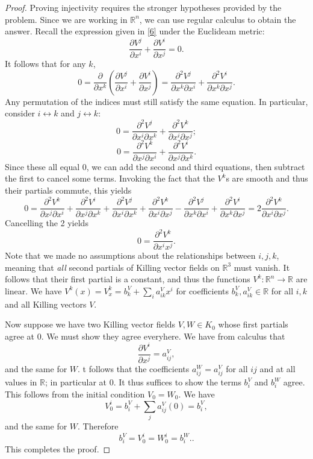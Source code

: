 \documentclass[11pt, letterpaper]{article}
\begin{document}
\begin{proof}
	Proving injectivity requires the stronger hypotheses provided by the problem. Since we are working in $\mathbb{R} ^n$, we can use regular calculus to obtain the answer. Recall the expression given in \cref{6} under the Euclideam metric:
	\[
		\frac{\partial V^j}{\partial x^i} +\frac{\partial V^i}{\partial x^j} =0
	.\]
	It follows that for any $k$,
	\[
		0=\frac{\partial }{\partial x^k} \left( \frac{\partial V^j}{\partial x^i} +\frac{\partial V^i}{\partial x^j}  \right) =\frac{\partial^2 V^j}{\partial x^k \partial x^i} + \frac{\partial^2 V^i}{\partial x^k \partial x^j} 
	.\]
	Any permutation of the indices must still satisfy the same equation. In particular, consider $i\leftrightarrow k$ and $j\leftrightarrow k$:
	\[
		0=\frac{\partial^2 V^j}{\partial x^i \partial x^k} + \frac{\partial^2 V^k}{\partial x^i \partial x^j} 
	;\]
	\[
		0=\frac{\partial^2 V^k}{\partial x^j \partial x^i} + \frac{\partial^2 V^i}{\partial x^j \partial x^k} 
	.\]
	Since these all equal 0, we can add the second and third equations, then subtract the first to cancel some terms. Invoking the fact that the $V^k$s are smooth and thus their partials commute, this yields
	\[
		0=\frac{\partial^2 V^k}{\partial x^j \partial x^i} + \frac{\partial^2 V^i}{\partial x^j \partial x^k} +\frac{\partial^2 V^j}{\partial x^i \partial x^k} + \frac{\partial^2 V^k}{\partial x^i \partial x^j}-\frac{\partial^2 V^j}{\partial x^k \partial x^i} + \frac{\partial^2 V^i}{\partial x^k \partial x^j} =2 \frac{\partial ^2V^k}{\partial x^i \partial x^j} 
	.\]
	Cancelling the 2 yields
	\[
		0=\frac{\partial ^2V^k}{\partial x^ix^j} 
	.\]
	Note that we made no assumptions about the relationships between $i,j,k$, meaning that \emph{all} second partials of Killing vector fields on $\mathbb{R} ^3$ must vanish. It follows that their first partial is a constant, and thus the functions $V^k : \mathbb{R} ^n \to \mathbb{R} $ are linear. We have $V^k(x)=V^k_x =b^V_{k} + \sum_{i} a^V_{ik} x^i$ for coefficients $b^V_k,a^V_{ik} \in\mathbb{R} $ for all $i,k$ and all Killing vectors $V$.

	Now suppose we have two Killing vector fields $V,W\in K_0$ whose first partials agree at 0. We must show they agree everyhere. We have from calculus that
	\[
		\frac{\partial V^i}{\partial x^j} =a_{ij} ^V
	,\]
	and the same for $W$. t follows that the coefficients $a^W_{ij} =a^V_{ij} $ for all $ij$ and at all values in $\mathbb{R} $; in particular at 0. It thus suffices to show the terms $b_i^V$ and $b_i^W$ agree. This follows from the initial condition $V_0=W_0$. We have
	\[
		V^i_0 = b_i^V+\sum_{j} a_{ij}^V(0)=b_i^V,
	\]
	and the same for $W$. Therefore
	\[
		b_i^V = V^i_0=W^i_0 = b^W_i.
	.\]
	This completes the proof.


\end{proof}
\end{document}
